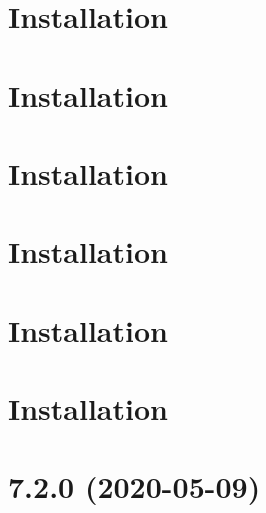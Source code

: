 \let\mypdfximage\pdfximage\def\pdfximage{\immediate\mypdfximage}\documentclass[twoside]{book}
\newcommand{\+}{\discretionary{\mbox{\scriptsize$\hookleftarrow$}}{}{}}
\begin{document}
\chapter{Installation}
\label{md_heap-visualizer_node_modules__0dtypes_events__r_e_a_d_m_e}

\chapter{Installation}
\label{md_heap-visualizer_node_modules__0dtypes_glob__r_e_a_d_m_e}

\chapter{Installation}
\label{md_heap-visualizer_node_modules__0dtypes_minimatch__r_e_a_d_m_e}

\chapter{Installation}
\label{md_heap-visualizer_node_modules__0dtypes_mocha__r_e_a_d_m_e}

\chapter{Installation}
\label{md_heap-visualizer_node_modules__0dtypes_node__r_e_a_d_m_e}

\chapter{Installation}
\label{md_heap-visualizer_node_modules__0dtypes_vscode__r_e_a_d_m_e}

\chapter{7.2.0 (2020-\/05-\/09)}
\label{md_heap-visualizer_node_modules_acorn__c_h_a_n_g_e_l_o_g}

\end{document}
